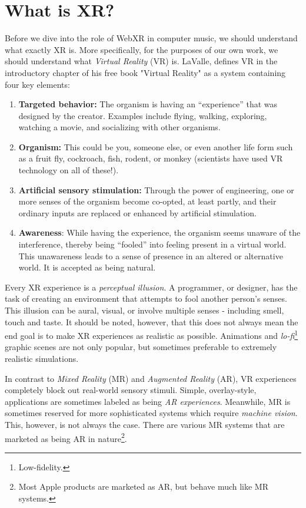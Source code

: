 \section{What is XR?}

Before we dive into the role of WebXR in computer music, we should understand what exactly XR is. More specifically, for the purposes of our own work, we should understand what \textit{Virtual Reality} (VR) is. LaValle, defines VR in the introductory chapter of his free book "Virtual Reality" \cite{lavalle2016virtual} as a system containing four key elements:

\begin{enumerate}
    \item \textbf{Targeted behavior:} The organism is having an “experience” that was designed by the creator. Examples include flying, walking, exploring, watching a movie, and socializing with other organisms.
    \item \textbf{Organism:} This could be you, someone else, or even another life form such as a fruit fly, cockroach, fish, rodent, or monkey (scientists have used VR technology on all of these!).
    \item \textbf{Artificial sensory stimulation:} Through the power of engineering, one or more senses of the organism become co-opted, at least partly, and their ordinary inputs are replaced or enhanced by artificial stimulation.
    \item \textbf{Awareness}: While having the experience, the organism seems unaware of the interference, thereby being “fooled” into feeling present in a virtual world. This unawareness leads to a sense of presence in an altered or alternative world. It is accepted as being natural.
\end{enumerate}

Every XR experience is a \textit{perceptual illusion}. A programmer, or designer, has the task of creating an environment that attempts to fool another person's senses. This illusion can be aural, visual, or involve multiple senses - including smell, touch and taste. It should be noted, however, that this does not always mean the end goal is to make XR experiences as realistic as possible. Animations and \textit{lo-fi}\footnote{Low-fidelity.} graphic scenes are not only popular, but sometimes preferable to extremely realistic simulations.

In contrast to \textit{Mixed Reality} (MR) and \textit{Augmented Reality} (AR), VR experiences completely block out real-world sensory stimuli. Simple, overlay-style, applications are sometimes labeled as being \textit{AR experiences}. Meanwhile, MR is sometimes reserved for more sophisticated systems which require \textit{machine vision}. This, however, is not always the case. There are various MR systems that are marketed as being AR in nature\footnote{Most Apple products are marketed as AR, but behave much like MR systems.}. 

